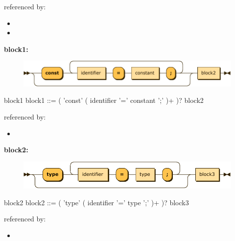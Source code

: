 \documentclass[10pt,a4paper,twoside]{article}
\providecommand{\tightlist}{%
  \setlength{\itemsep}{0pt}\setlength{\parskip}{0pt}}
\newcounter{grammarbox}[section]
\begin{document}
referenced by:

\begin{itemize}
\tightlist
\item
\item
\end{itemize}

\textbf{block1:}

\begin{figure}[H]
\centering
\includegraphics{diagram/block1.pdf}

\end{figure}

\begin{grammarbox}{block1}
\vspace{0.5em}
block1   ::= ( 'const' ( identifier '=' constant ';' )+ )? block2
\end{grammarbox}

referenced by:

\begin{itemize}
\tightlist
\item
\end{itemize}

\textbf{block2:}

\begin{figure}[H]
\centering
\includegraphics{diagram/block2.pdf}

\end{figure}

\begin{grammarbox}{block2}
\vspace{0.5em}
block2   ::= ( 'type' ( identifier '=' type ';' )+ )? block3
\end{grammarbox}

referenced by:

\begin{itemize}
\tightlist
\item
\end{itemize}
\end{document}
